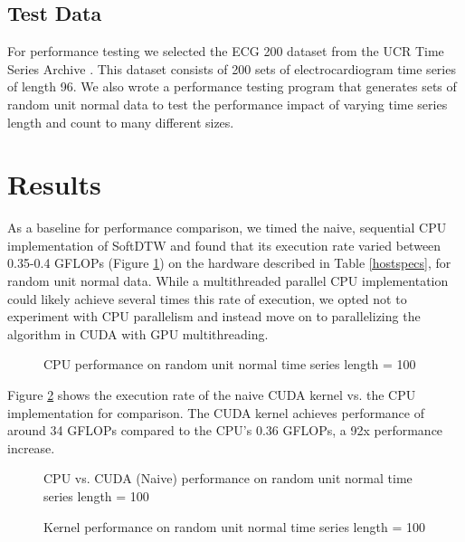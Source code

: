\documentclass[12pt, letterpaper]{article}
\begin{document}
\subsection{Test Data}

For performance testing we selected the ECG 200 dataset from the UCR Time Series
Archive \cite{dau_ucr_2019}. This dataset consists of 200 sets of
electrocardiogram time series of length 96. We also wrote a performance testing
program that generates sets of random unit normal data to test the performance
impact of varying time series length and count to many different sizes.


\section{Results}
\FloatBarrier

As a baseline for performance comparison, we timed the naive, sequential CPU
implementation of SoftDTW and found that its execution rate varied between
0.35-0.4 GFLOPs (Figure \ref{plot_cpu}) on the hardware described in Table
\ref{hostspecs}, for random unit normal data. While a multithreaded parallel CPU
implementation could likely achieve several times this rate of execution, we
opted not to experiment with CPU parallelism and instead move on to
parallelizing the algorithm in CUDA with GPU multithreading.

\begin{figure}[htbp]
    \begin{center}
        \scalebox{0.85}{}
    \end{center}
    \caption{CPU performance on random unit normal time series length = 100}
    \label{plot_cpu}
\end{figure}

Figure \ref{plot_cpu_gpu} shows the execution rate of the naive CUDA kernel
vs. the CPU implementation for comparison. The CUDA kernel achieves performance
of around 34 GFLOPs compared to the CPU's 0.36 GFLOPs, a 92x performance
increase.

\begin{figure}[htbp]
    \begin{center}
        \scalebox{0.85}{}
    \end{center}
    \caption{CPU vs. CUDA (Naive) performance on random unit normal time series
      length = 100}
    \label{plot_cpu_gpu}
\end{figure}


\begin{figure}[htbp]
    \begin{center}
        \scalebox{0.85}{}
    \end{center}
    \caption{Kernel performance on random unit normal time series length =
      100}
    \label{plot_multi}
\end{figure}
\end{document}
